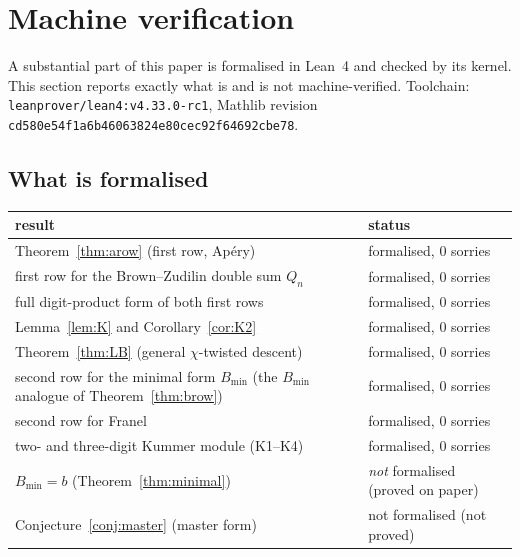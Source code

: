\section{Machine verification}
\label{sec:lean}

A substantial part of this paper is formalised in Lean~4 and checked by its kernel. This
section reports exactly what is and is not machine-verified. Toolchain:
\texttt{leanprover/lean4:v4.33.0-rc1}, Mathlib revision
\texttt{cd580e54f1a6b46063824e80cec92f64692cbe78}.

\subsection{What is formalised}

\begin{center}\small
\begin{tabular}{@{}ll@{}}
\toprule
result & status\\
\midrule
Theorem~\ref{thm:arow} (first row, Ap\'ery) & formalised, $0$ sorries\\
first row for the Brown--Zudilin double sum $Q_n$ & formalised, $0$ sorries\\
full digit-product form of both first rows & formalised, $0$ sorries\\
Lemma~\ref{lem:K} and Corollary~\ref{cor:K2} & formalised, $0$ sorries\\
Theorem~\ref{thm:LB} (general $\chi$-twisted descent) & formalised, $0$ sorries\\
second row for the minimal form $B_{\min}$ (the $B_{\min}$ analogue of
Theorem~\ref{thm:brow}) & formalised, $0$ sorries\\
second row for Franel & formalised, $0$ sorries\\
two- and three-digit Kummer module (K1--K4) & formalised, $0$ sorries\\
\midrule
$B_{\min}=b$ (Theorem~\ref{thm:minimal}) & \emph{not} formalised (proved on paper)\\
Conjecture~\ref{conj:master} (master form) & not formalised (not proved)\\
\bottomrule
\end{tabular}
\end{center}

